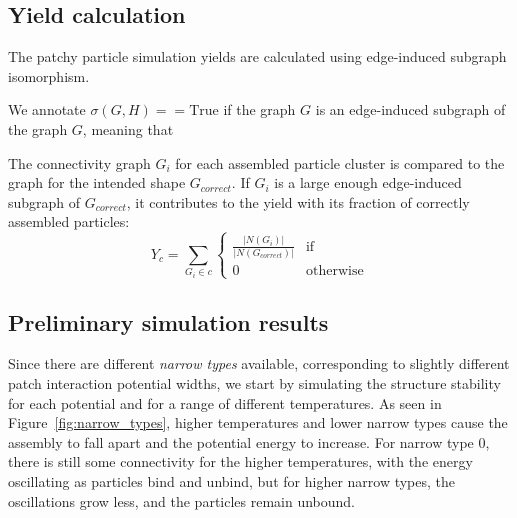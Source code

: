 \subsection{Yield calculation}
The patchy particle simulation yields are calculated using edge-induced subgraph isomorphism. 

We annotate \(\sigma(G,H) == \text{True}\) if the graph \(G\) is an edge-induced subgraph of the graph \(G\), meaning that

The connectivity graph \(G_i\) for each assembled particle cluster is compared to the graph for the intended shape \(G_{correct}\). If \(G_i\) is a large enough edge-induced subgraph of \(G_{correct}\), it contributes to the yield with its fraction of correctly assembled particles:
\begin{equation}
    Y_{c} = \sum_{G_i \in c} \begin{cases} 
           \frac{\left|N(G_i)\right|}{\left|N(G_{correct})\right|} & \text{if}  \\
                          0 & \text{otherwise}
                        \end{cases}
\end{equation}

\subsection{Preliminary simulation results}
Since there are different \emph{narrow types} available, corresponding to slightly different patch interaction potential widths, we start by simulating the structure stability for each potential and for a range of different temperatures. As seen in Figure~\ref{fig:narrow_types}, higher temperatures and lower narrow types cause the assembly to fall apart and the potential energy to increase. For narrow type 0, there is still some connectivity for the higher temperatures, with the energy oscillating as particles bind and unbind, but for higher narrow types, the oscillations grow less, and the particles remain unbound.

